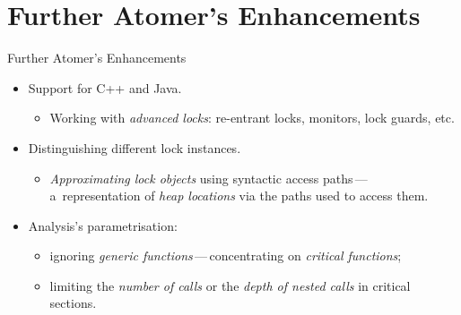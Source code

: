\documentclass[10pt, xcolor=pdflatex, hyperref={unicode}, aspectratio=169]{beamer}
\begin{document}
\section{Further Atomer's Enhancements}
\begin{frame}{Further Atomer's Enhancements}
    \begin{itemize}\setlength\itemsep{2.5em}
        \item Support for \alert{C++} and \alert{Java}.
            \medskip
            \begin{itemize}
                \item Working with \emph{advanced locks}: re-entrant locks, monitors, lock guards, etc.
            \end{itemize}

        \item Distinguishing \alert{different lock instances}.
            \medskip
            \begin{itemize}
                \item \emph{Approximating lock objects} using \alert{syntactic access paths}\,---\,a~representation of \emph{heap locations} via the paths used to access them.
            \end{itemize}

        \item Analysis's \alert{parametrisation}:
            \medskip
            \begin{itemize}\setlength\itemsep{.8em}
                \item \alert{ignoring} \emph{generic functions}\,---\,\alert{concentrating on} \emph{critical functions};

                \item \alert{limiting} the \emph{number of calls} or the \emph{depth of nested calls} in \alert{critical sections}.
            \end{itemize}
    \end{itemize}
\end{frame}


\end{document}
